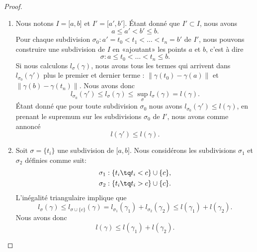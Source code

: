 \begin{proof}
    \begin{enumerate}
        \item
            Nous notons $I=\mathopen[ a , b \mathclose]$ et $I'=\mathopen[ a' , b' \mathclose]$. Étant donné que $I'\subset I$, nous avons
            \begin{equation}
                a\leq a'<b'\leq b.
            \end{equation}
            Pour chaque subdivision $\sigma_0:a'=t_0<t_1<\ldots<t_n=b'$ de $I'$, nous pouvons construire une subdivision de $I$ en «ajoutant» les points $a$ et $b$, c'est à dire
            \begin{equation}
                \sigma:a\leq t_0<\ldots<t_n\leq b.
            \end{equation}
            Si nous calculons $l_{\sigma}(\gamma)$, nous avons tous les termes qui arrivent dans $l_{\sigma_0}(\gamma')$ plus le premier et dernier terme : $\| \gamma(t_0)-\gamma(a) \|$ et $\| \gamma(b)-\gamma(t_n)\|$. Nous avons donc
            \begin{equation}
                l_{\sigma_0}(\gamma')\leq l_{\sigma}(\gamma)\leq\sup_{\sigma}l_{\sigma}(\gamma)=l(\gamma).
            \end{equation}
            Étant donné que pour toute subdivision $\sigma_0$ nous avons $l_{\sigma_0}(\gamma')\leq l(\gamma)$, en prenant le supremum sur les subdivisions $\sigma_0$ de $I'$, nous avons comme annoncé
            \begin{equation}
                l(\gamma')\leq l(\gamma).
            \end{equation}
        \item
            Soit $\sigma=\{ t_i \}$ une subdivision de $\mathopen[ a , b \mathclose]$. Nous considérons les subdivisions $\sigma_1$ et $\sigma_2$ définies comme suit:
            \begin{equation}
                \begin{aligned}[]
                    \sigma_1&:\{ t_i\tq t_i< c \}\cup\{ c \},\\
                    \sigma_2&:\{ t_i\tq t_i> c \}\cup\{ c \}.
                \end{aligned}
            \end{equation}
            L'inégalité triangulaire implique que
            \begin{equation}
                l_{\sigma}(\gamma)\leq l_{\sigma\cup\{ c \}}(\gamma)=l_{\sigma_1}(\gamma_1)+l_{\sigma_2}(\gamma_2)\leq l(\gamma_1)+l(\gamma_2).
            \end{equation}
            Nous avons donc 
            \begin{equation}    \label{EqIneglglglgud}
                l(\gamma)\leq l(\gamma_1)+l(\gamma_2).
            \end{equation}


\end{enumerate}
\end{proof}
